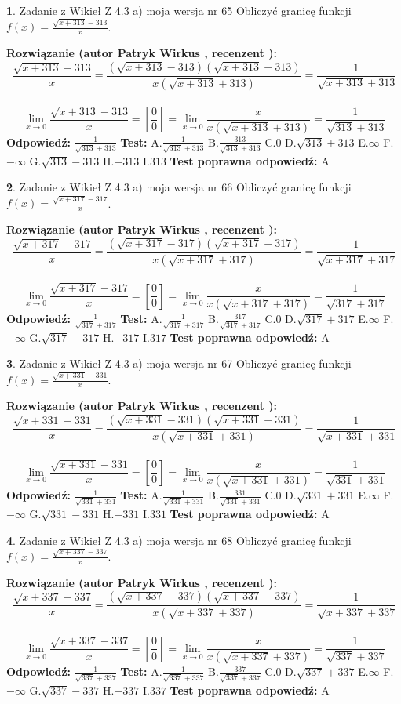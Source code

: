 \documentclass[12pt, a4paper]{article}
\theoremstyle{definition} %
\newtheorem{zad}{}
\newcommand{\zadStart}[1]{\begin{zad}#1\newline}
\newcommand{\zadStop}{\end{zad}}
\newcommand{\rozwStart}[2]{\noindent \textbf{Rozwiązanie (autor #1 , recenzent #2): }\newline}
\newcommand{\rozwStop}{\newline}
\newcommand{\odpStart}{\noindent \textbf{Odpowiedź:}\newline}
\newcommand{\odpStop}{\newline}
\newcommand{\testStart}{\noindent \textbf{Test:}\newline}
\newcommand{\testStop}{\newline}
\newcommand{\kluczStart}{\noindent \textbf{Test poprawna odpowiedź:}\newline}
\newcommand{\kluczStop}{\newline}
\begin{document}
\zadStart{Zadanie z Wikieł Z 4.3 a) moja wersja nr 65}
Obliczyć granicę funkcji $f(x)=\frac{\sqrt{x+313}-313}{x}$.
\zadStop
\rozwStart{Patryk Wirkus}{}
$$\frac{\sqrt{x+313}-313}{x}=\frac{(\sqrt{x+313}-313)(\sqrt{x+313}+313)}{x(\sqrt{x+313}+313)}=\frac{1}{\sqrt{x+313}+313}$$
\\
$$\lim\limits_{x\to0}\frac{\sqrt{x+313}-313}{x}=[\frac{0}{0}]=
\lim\limits_{x\to0}\frac{x}{x(\sqrt{x+313}+313)} = \frac{1}{\sqrt{313}+313}$$
\rozwStop
\odpStart
$\frac{1}{\sqrt{313}+313}$
\odpStop
\testStart
A.$\frac{1}{\sqrt{313}+313}$
B.$\frac{313}{\sqrt{313}+313}$
C.$0$
D.$\sqrt{313}+313$
E.$\infty$
F.$-\infty$
G.$\sqrt{313}-313$
H.$-313$
I.$313$
\testStop
\kluczStart
A
\kluczStop



\zadStart{Zadanie z Wikieł Z 4.3 a) moja wersja nr 66}
Obliczyć granicę funkcji $f(x)=\frac{\sqrt{x+317}-317}{x}$.
\zadStop
\rozwStart{Patryk Wirkus}{}
$$\frac{\sqrt{x+317}-317}{x}=\frac{(\sqrt{x+317}-317)(\sqrt{x+317}+317)}{x(\sqrt{x+317}+317)}=\frac{1}{\sqrt{x+317}+317}$$
\\
$$\lim\limits_{x\to0}\frac{\sqrt{x+317}-317}{x}=[\frac{0}{0}]=
\lim\limits_{x\to0}\frac{x}{x(\sqrt{x+317}+317)} = \frac{1}{\sqrt{317}+317}$$
\rozwStop
\odpStart
$\frac{1}{\sqrt{317}+317}$
\odpStop
\testStart
A.$\frac{1}{\sqrt{317}+317}$
B.$\frac{317}{\sqrt{317}+317}$
C.$0$
D.$\sqrt{317}+317$
E.$\infty$
F.$-\infty$
G.$\sqrt{317}-317$
H.$-317$
I.$317$
\testStop
\kluczStart
A
\kluczStop



\zadStart{Zadanie z Wikieł Z 4.3 a) moja wersja nr 67}
Obliczyć granicę funkcji $f(x)=\frac{\sqrt{x+331}-331}{x}$.
\zadStop
\rozwStart{Patryk Wirkus}{}
$$\frac{\sqrt{x+331}-331}{x}=\frac{(\sqrt{x+331}-331)(\sqrt{x+331}+331)}{x(\sqrt{x+331}+331)}=\frac{1}{\sqrt{x+331}+331}$$
\\
$$\lim\limits_{x\to0}\frac{\sqrt{x+331}-331}{x}=[\frac{0}{0}]=
\lim\limits_{x\to0}\frac{x}{x(\sqrt{x+331}+331)} = \frac{1}{\sqrt{331}+331}$$
\rozwStop
\odpStart
$\frac{1}{\sqrt{331}+331}$
\odpStop
\testStart
A.$\frac{1}{\sqrt{331}+331}$
B.$\frac{331}{\sqrt{331}+331}$
C.$0$
D.$\sqrt{331}+331$
E.$\infty$
F.$-\infty$
G.$\sqrt{331}-331$
H.$-331$
I.$331$
\testStop
\kluczStart
A
\kluczStop



\zadStart{Zadanie z Wikieł Z 4.3 a) moja wersja nr 68}
Obliczyć granicę funkcji $f(x)=\frac{\sqrt{x+337}-337}{x}$.
\zadStop
\rozwStart{Patryk Wirkus}{}
$$\frac{\sqrt{x+337}-337}{x}=\frac{(\sqrt{x+337}-337)(\sqrt{x+337}+337)}{x(\sqrt{x+337}+337)}=\frac{1}{\sqrt{x+337}+337}$$
\\
$$\lim\limits_{x\to0}\frac{\sqrt{x+337}-337}{x}=[\frac{0}{0}]=
\lim\limits_{x\to0}\frac{x}{x(\sqrt{x+337}+337)} = \frac{1}{\sqrt{337}+337}$$
\rozwStop
\odpStart
$\frac{1}{\sqrt{337}+337}$
\odpStop
\testStart
A.$\frac{1}{\sqrt{337}+337}$
B.$\frac{337}{\sqrt{337}+337}$
C.$0$
D.$\sqrt{337}+337$
E.$\infty$
F.$-\infty$
G.$\sqrt{337}-337$
H.$-337$
I.$337$
\testStop
\kluczStart
A
\kluczStop
\end{document}
